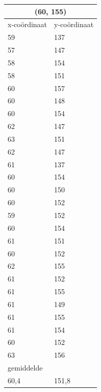 \documentclass{article}
\begin{document}
\begin{tabular}{ |l|l| }
  \hline
  \multicolumn{2}{|c|}{(60, 155)} \\
  \hline
  x-co\"ordinaat & y-co\"ordinaat \\ \hline
     59 & 137\\ \hline
     57 & 147\\ \hline
     58 & 154\\ \hline
     58 & 151\\ \hline
     60 & 157\\ \hline
     60 & 148\\ \hline
     60 & 154\\ \hline
     62 & 147\\ \hline
     63 & 151\\ \hline
     62 & 147\\ \hline
     61 & 137\\ \hline
     60 & 154\\ \hline
     60 & 150\\ \hline
     60 & 152\\ \hline
     59 & 152\\ \hline
     60 & 154\\ \hline
     61 & 151\\ \hline
     60 & 152\\ \hline
     62 & 155\\ \hline
     61 & 152\\ \hline
     61 & 155\\ \hline
     61 & 149\\ \hline
     61 & 155\\ \hline
     61 & 154\\ \hline
     60 & 152\\ \hline
     63 & 156\\ \hline\hline
     \multicolumn{2}{|l|}{gemiddelde} \\ \hline
     60,4  & 151,8 \\ \hline
\end{tabular}
\end{document}
